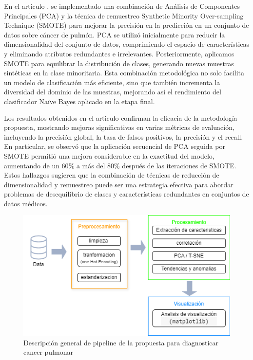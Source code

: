 \documentclass[10pt,journal,compsoc]{IEEEtran}
\begin{document}
En el articulo \cite{arxiv14031949}, se implementado una combinación de Análisis de Componentes Principales (PCA) y la técnica de remuestreo Synthetic Minority Over-sampling Technique (SMOTE) para mejorar la precisión en la predicción en un conjunto de datos sobre cáncer de pulmón. PCA se utilizó inicialmente para reducir la dimensionalidad del conjunto de datos, comprimiendo el espacio de características y eliminando atributos redundantes e irrelevantes. Posteriormente, aplicamos SMOTE para equilibrar la distribución de clases, generando nuevas muestras sintéticas en la clase minoritaria. Esta combinación metodológica no solo facilita un modelo de clasificación más eficiente, sino que también incrementa la diversidad del dominio de las muestras, mejorando así el rendimiento del clasificador Naïve Bayes aplicado en la etapa final.

Los resultados obtenidos en el articulo  \cite{arxiv14031949} confirman la eficacia de la metodología propuesta, mostrando mejoras significativas en varias métricas de evaluación, incluyendo la precisión global, la tasa de falsos positivos, la precisión y el recall. En particular, se observó que la aplicación secuencial de PCA seguida por SMOTE permitió una mejora considerable en la exactitud del modelo, aumentando de un 60$\%$ a más del 80$\%$ después de las iteraciones de SMOTE. Estos hallazgos sugieren que la combinación de técnicas de reducción de dimensionalidad y remuestreo puede ser una estrategia efectiva para abordar problemas de desequilibrio de clases y características redundantes en conjuntos de datos médicos.


\begin{figure}[htb]
    \centering
    \includegraphics[width=\linewidth]{imagenes/pipeline.png} %
    \caption{Descripción general de pipeline de la propuesta para diagnosticar cancer pulmonar}
    \label{fig:pipeline}
\end{figure}
\end{document}
